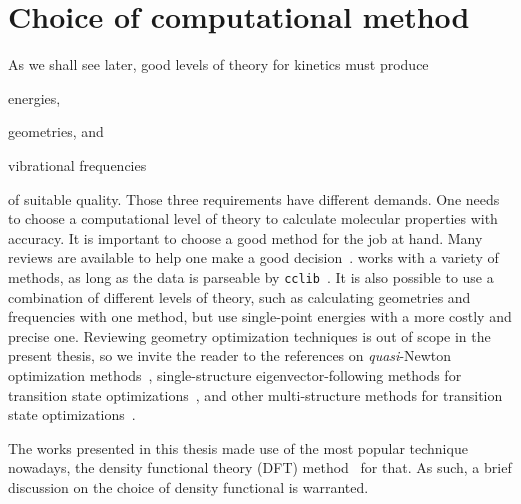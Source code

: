 \section{Choice of computational method}

As we shall see later,
good levels of theory for kinetics
must produce
\begin{enumerate*}
	\item energies,
	\item geometries,
	      and
	\item vibrational frequencies
\end{enumerate*}
of suitable quality.
Those three requirements have different demands.
One needs to choose a computational level of theory to calculate
molecular properties with accuracy.
It is important to choose a good method for the job at hand.
Many reviews are available to help one make a good decision~\cite{Goerigk_2011,Goerigk_2019,Mardirossian_2017,Morgante_2020,Bursch_2022}.
\overreact{} works with a variety of methods,
as long as the data is parseable by \texttt{cclib}~\cite{O_boyle_2008}.
It is also possible to use a combination of different levels of theory,
such as calculating geometries and frequencies with one method,
but use single-point energies with a more costly and precise one.
Reviewing geometry optimization techniques is out of scope in the present
thesis,
so we invite the reader to the references
on \emph{quasi}-Newton optimization methods~\cite{Banerjee_1985,Schlegel_1987},
single-structure eigenvector-following methods for transition state optimizations~\cite{Banerjee_1985,Schlegel_1987,Mauro_2005},
and other multi-structure methods for transition state optimizations~\cite{Peng_1993,Peng_1996}.

The works presented in this thesis made use of the most popular technique nowadays,
the density functional theory (DFT)
method~\cite{Hohenberg_1964,Kohn_1965,Perdew_2014,Kryachko_2014,Yu_2016} for
that.
As such,
a brief discussion on the choice of density functional is warranted.

